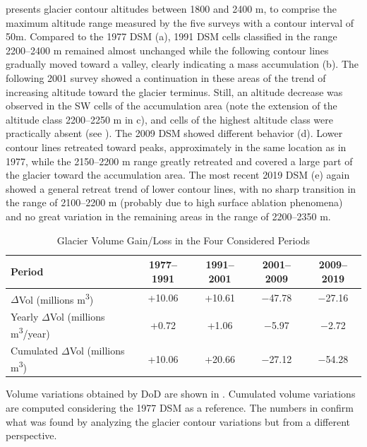  presents glacier contour altitudes between 1800 and 2400 m, to comprise the maximum altitude range measured by the five surveys with a contour interval of 50m.
Compared to the 1977 DSM (a), 1991 DSM cells classified in the range 2200–2400 m remained almost unchanged while the following contour lines gradually moved toward a valley, clearly indicating a mass accumulation (b).
The following 2001 survey showed a continuation in these areas of the trend of increasing altitude toward the glacier terminus. 
Still, an altitude decrease was observed in the SW cells of the accumulation area (note the extension of the altitude class 2200–2250 m in c), and cells of the highest altitude class were practically absent (see ). 
The 2009 DSM showed different behavior (d). 
Lower contour lines retreated toward peaks, approximately in the same location as in 1977, while the 2150–2200 m range greatly retreated and covered a large part of the glacier toward the accumulation area.
The most recent 2019 DSM (e) again showed a general retreat trend of lower contour lines, with no sharp transition in the range of 2100–2200 m (probably due to high surface ablation phenomena) and no great variation in the remaining areas in the range of 2200–2350 m.

\begin{table}[ht]
  \centering
  \caption{Glacier Volume Gain/Loss in the Four Considered Periods}
  \label{tab:2:glacier_volume_variations}
  \begin{tabular}{lcccc}
    \hline
    Period & 1977--1991 & 1991--2001 & 2001--2009 & 2009--2019 \\
    \hline
    $\Delta$Vol (millions m\textsuperscript{3}) & +10.06 & +10.61 & $-$47.78 & $-$27.16 \\
    Yearly $\Delta$Vol (millions m\textsuperscript{3}/year) & +0.72 & +1.06 & $-$5.97 & $-$2.72 \\
    Cumulated $\Delta$Vol (millions m\textsuperscript{3}) & +10.06 & +20.66 & $-$27.12 & $-$54.28 \\
    \hline
  \end{tabular}
\end{table}

Volume variations obtained by DoD are shown in .
Cumulated volume variations are computed considering the 1977 DSM as a reference.
The numbers in  confirm what was found by analyzing the glacier contour variations but from a different perspective. 

